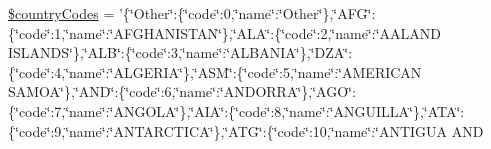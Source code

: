 \begin{DoxyCompactItemize}
\hyperlink{class_fifth_gear_a4cf81942a657b792747a30d28ec2e776}{\$country\-Codes} = '\{\char`\"{}Other\char`\"{}\-:\{\char`\"{}code\char`\"{}\-:0,\char`\"{}name\char`\"{}\-:\char`\"{}Other\char`\"{}\},\char`\"{}A\-F\-G\char`\"{}\-:\{\char`\"{}code\char`\"{}\-:1,\char`\"{}name\char`\"{}\-:\char`\"{}A\-F\-G\-H\-A\-N\-I\-S\-T\-A\-N\char`\"{}\},\char`\"{}A\-L\-A\char`\"{}\-:\{\char`\"{}code\char`\"{}\-:2,\char`\"{}name\char`\"{}\-:\char`\"{}A\-A\-L\-A\-N\-D I\-S\-L\-A\-N\-D\-S\char`\"{}\},\char`\"{}A\-L\-B\char`\"{}\-:\{\char`\"{}code\char`\"{}\-:3,\char`\"{}name\char`\"{}\-:\char`\"{}A\-L\-B\-A\-N\-I\-A\char`\"{}\},\char`\"{}D\-Z\-A\char`\"{}\-:\{\char`\"{}code\char`\"{}\-:4,\char`\"{}name\char`\"{}\-:\char`\"{}A\-L\-G\-E\-R\-I\-A\char`\"{}\},\char`\"{}A\-S\-M\char`\"{}\-:\{\char`\"{}code\char`\"{}\-:5,\char`\"{}name\char`\"{}\-:\char`\"{}A\-M\-E\-R\-I\-C\-A\-N S\-A\-M\-O\-A\char`\"{}\},\char`\"{}A\-N\-D\char`\"{}\-:\{\char`\"{}code\char`\"{}\-:6,\char`\"{}name\char`\"{}\-:\char`\"{}A\-N\-D\-O\-R\-R\-A\char`\"{}\},\char`\"{}A\-G\-O\char`\"{}\-:\{\char`\"{}code\char`\"{}\-:7,\char`\"{}name\char`\"{}\-:\char`\"{}A\-N\-G\-O\-L\-A\char`\"{}\},\char`\"{}A\-I\-A\char`\"{}\-:\{\char`\"{}code\char`\"{}\-:8,\char`\"{}name\char`\"{}\-:\char`\"{}A\-N\-G\-U\-I\-L\-L\-A\char`\"{}\},\char`\"{}A\-T\-A\char`\"{}\-:\{\char`\"{}code\char`\"{}\-:9,\char`\"{}name\char`\"{}\-:\char`\"{}A\-N\-T\-A\-R\-C\-T\-I\-C\-A\char`\"{}\},\char`\"{}A\-T\-G\char`\"{}\-:\{\char`\"{}code\char`\"{}\-:10,\char`\"{}name\char`\"{}\-:\char`\"{}A\-N\-T\-I\-G\-U\-A A\-N\-D 
\end{DoxyCompactItemize}
